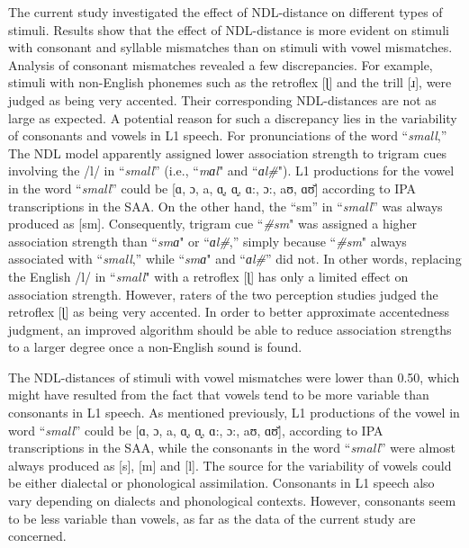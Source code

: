 The current study investigated the effect of NDL-distance on different types of stimuli. Results show that the effect of NDL-distance is more evident on stimuli with consonant and syllable mismatches than on stimuli with vowel mismatches. Analysis of consonant mismatches revealed a few discrepancies. For example, stimuli with non-English phonemes such as the retroflex [ɭ] and the trill [ɹ], were judged as being very accented. Their corresponding NDL-distances are not as large as expected. A potential reason for such a discrepancy lies in the variability of consonants and vowels in L1 speech. For pronunciations of the word “\textit{small},” The NDL model apparently assigned lower association strength to trigram cues involving the /l/ in “\textit{small}” (i.e., ``\textit{mɑl}" and ``\textit{ɑl\#}"). L1 productions for the vowel in the word “\textit{small}” could be [ɑ, ɔ, a, ɑ̘, ɑ̝, ɑ:, ɔ:, aʊ, ɑʊ̆] according to IPA transcriptions in the SAA. On the other hand, the “sm” in “\textit{small}” was always produced as [sm]. Consequently, trigram cue ``\textit{\#sm}" was assigned a higher association strength than ``\textit{smɑ}" or “\textit{ɑl\#},” simply because ``\textit{\#sm}" always associated with “\textit{small},” while ``\textit{smɑ}" and “\textit{ɑl\#}” did not. In other words, replacing the English /l/ in ``\textit{small}" with a retroflex [ɭ] has only a limited effect on association strength. However, raters of the two perception studies judged the retroflex [ɭ] as being very accented. In order to better approximate accentedness judgment, an improved algorithm should be able to reduce association strengths to a larger degree once a non-English sound is found. 

The NDL-distances of stimuli with vowel mismatches were lower than 0.50, which might have resulted from the fact that vowels tend to be more variable than consonants in L1 speech. As mentioned previously, L1 productions of the vowel in word “\textit{small}” could be [ɑ, ɔ, a, ɑ̘, ɑ̝, ɑ:, ɔ:, aʊ, ɑʊ̆], according to IPA transcriptions in the SAA, while the consonants in the word “\textit{small}” were almost always produced as [s], [m] and [l]. The source for the variability of vowels could be either dialectal or phonological assimilation. Consonants in L1 speech also vary depending on dialects and phonological contexts. However, consonants seem to be less variable than vowels, as far as the data of the current study are concerned. 

